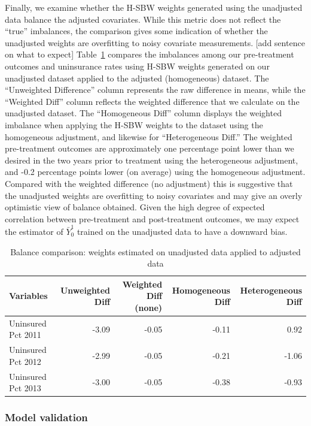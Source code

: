 \documentclass[aoas]{imsart}
\theoremstyle{plain}
\theoremstyle{remark}
\begin{document}
Finally, we examine whether the H-SBW weights generated using the unadjusted data balance the adjusted covariates. While this metric does not reflect the ``true'' imbalances, the comparison gives some indication of whether the unadjusted weights are overfitting to noisy covariate measurements. [add sentence on what to expect] Table~\ref{tab:balcomp} compares the imbalances among our pre-treatment outcomes and uninsurance rates using H-SBW weights generated on our unadjusted dataset applied to the adjusted (homogeneous) dataset. The ``Unweighted Difference'' column represents the raw difference in means, while the ``Weighted Diff'' column reflects the weighted difference that we calculate on the unadjusted dataset. The ``Homogeneous Diff'' column displays the weighted imbalance when applying the H-SBW weights to the dataset using the homogeneous adjustment, and likewise for ``Heterogeneous Diff.'' The weighted pre-treatment outcomes are approximately one percentage point lower than we desired in the two years prior to treatment using the heterogeneous adjustment, and -0.2 percentage points lower (on average) using the homogeneous adjustment. Compared with the weighted difference (no adjustment) this is suggestive that the unadjusted weights are overfitting to noisy covariates and may give an overly optimistic view of balance obtained. Given the high degree of expected correlation between pre-treatment and post-treatment outcomes, we may expect the estimator of $\bar{Y}^1_0$ trained on the unadjusted data to have a downward bias.

\begin{table}[ht]
\caption{Balance comparison: weights estimated on unadjusted data applied to adjusted data}
\label{tab:balcomp}
\begin{tabular}{lrrrr}
  \hline
Variables & Unweighted Diff & Weighted Diff (none) & Homogeneous Diff & Heterogeneous Diff\\ 
  \hline
Uninsured Pct 2011 & -3.09 & -0.05 & -0.11 & 0.92 \\ 
  Uninsured Pct 2012 & -2.99 & -0.05 & -0.21 & -1.06 \\ 
  Uninsured Pct 2013 & -3.00 & -0.05 & -0.38 & -0.93 \\
   \hline
\end{tabular}
\end{table}

\subsubsection{Model validation}
\end{document}
